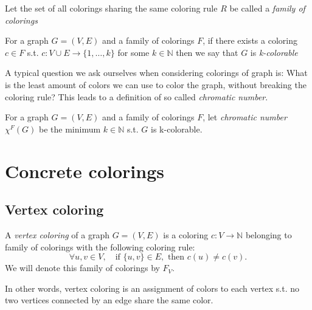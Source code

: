 \begin{definition}
    Let the set of all colorings sharing the same coloring rule $R$ be called a \textit{family of colorings}
\end{definition}

\begin{definition}
    For a graph $G=(V,E)$ and a family of colorings $F$, if there exists a coloring $c \in F$ s.t. $c: V \cup E \rightarrow \{1,\ldots,k\}$ for some $k \in \mathbb{N}$ then we say that $G$ is \textit{k-colorable}
\end{definition}

\begin{highlight}
A typical question we ask ourselves when considering colorings of graph is: What is the least amount of colors we can use to color the graph, without breaking the coloring rule? This leads to a definition of so called \textit{chromatic number}. 
\end{highlight}

\begin{definition}
    For a graph $G=(V,E)$ and a family of colorings $F$, let \textit{chromatic number} $\chi ^F (G)$ be the minimum $k \in \mathbb{N}$ s.t. $G$ is k-colorable.
\end{definition}

\section{Concrete colorings}

\subsection{Vertex coloring}

\begin{definition}
    A \textit{vertex coloring} of a graph $G=(V,E)$ is a coloring $c : V \rightarrow \mathbb{N}$ belonging to family of colorings with the following coloring rule:
    \begin{equation}\label{eqn:vtx_rule}
        \forall u,v \in V, \quad \text{if } \{u,v\} \in E, \text{ then } c(u) \neq c(v). 
        \tag{$R_V$}
    \end{equation}
    We will denote this family of colorings by $F_V$.
\end{definition}

In other words, vertex coloring is an assignment of colors to each vertex s.t. no two vertices connected by an edge share the same color.

